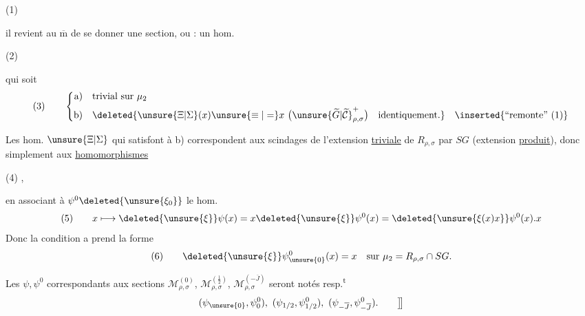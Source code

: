 \noindent (1)\quad
{}


il revient au $\overline{\mathrm m}$ de se donner une section,
ou : un hom.

\noindent (2)\quad
{}

qui soit 
\[
\text{(3)}\qquad
\left\{\begin{aligned}
\text{a)}\quad &\text{trivial sur }\mu_2\\
\text{b)}\quad &\deleted{\unsure{\Xi|\Sigma}(x)\unsure{\equiv|=}x\ \bigl(\unsure{\widetilde G|\widetilde{\mathcal C}}^+_{\rho,\sigma}\bigr)\quad\text{identiquement}.}\quad\inserted{\text{``remonte'' (1)}}
\end{aligned}\right.
\]

Les hom. $\unsure{\Xi|\Sigma}$ qui satisfont à b) correspondent
aux scindages de l'extension \uline{triviale} de
$R_{\rho,\sigma}$ par $SG$ (extension \uline{produit}), donc
simplement aux \uline{homomorphismes}

\noindent (4)\quad
{},



en associant à $\psi^0\deleted{\unsure{\xi_0}}$ le hom.
\[
(5)\qquad x\longmapsto \deleted{\unsure{\xi}}\psi(x)
=x\deleted{\unsure{\xi}}\psi^0(x)
=\deleted{\unsure{\xi(x)x}}\psi^0(x).x
\]
Donc la condition a prend la forme
\[
(6)\qquad \deleted{\unsure{\xi}}\psi^0_{\unsure{0}}(x)=x
\quad\text{sur }\mu_2=R_{\rho,\sigma}\cap SG.
\]

\margin{\deleted{\unsure{$\rho$}}}
Les $\psi,\psi^0$ correspondants aux  sections
$\mathcal M_{\rho,\sigma}^{(0)}$, $\mathcal M_{\rho,\sigma}^{(\frac12)}$,
$\mathcal M_{\rho,\sigma}^{(-\overline J)}$ seront notés resp.\textsuperscript{t}
\[
(\psi_{\unsure{0}},\psi^0_0),\ (\psi_{1/2},\psi^0_{1/2}),\
(\psi_{-\overline J},\psi^0_{-\overline J}).\qquad\big]\!\big]
\]

